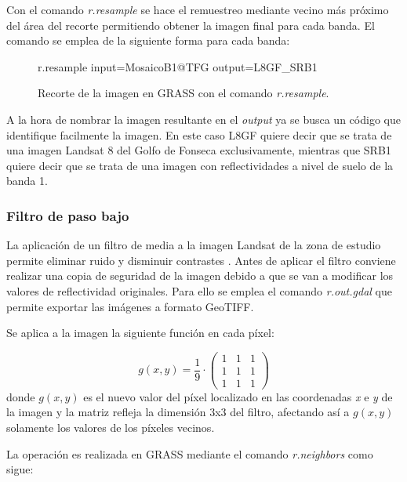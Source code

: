 Con el comando \textit{r.resample} se hace el remuestreo mediante vecino más próximo del área del recorte permitiendo obtener la imagen final para cada banda. El comando se emplea de la siguiente forma para cada banda:

\begin{figure}[h]
\centering
\begin{boxedverbatim}
	r.resample input=MosaicoB1@TFG output=L8GF_SRB1
\end{boxedverbatim}
\caption[Recorte de la imagen]{Recorte de la imagen en GRASS con el comando \textit{r.resample}.}
\end{figure}

A la hora de nombrar la imagen resultante en el \textit{output} ya se busca un código que identifique facilmente la imagen. En este caso L8GF quiere decir que se trata de una imagen Landsat 8 del Golfo de Fonseca exclusivamente, mientras que SRB1 quiere decir que se trata de una imagen con reflectividades a nivel de suelo de la banda 1.

\subsubsection{Filtro de paso bajo}
La aplicación de un filtro de media a la imagen Landsat de la zona de estudio permite eliminar ruido y disminuir contrastes \citep{aldalur2002}. Antes de aplicar el filtro conviene realizar una copia de seguridad de la imagen debido a que se van a modificar los valores de reflectividad originales. Para ello se emplea el comando \textit{r.out.gdal} que permite exportar las imágenes a formato GeoTIFF.\Sep

Se aplica a la imagen la siguiente función en cada píxel:

\begin{equation}
	g(x,y)=\frac{1}{9} \cdot \left(\begin{array}{ccc}
								   	1&1&1\\
								   	1&1&1\\
							 	   	1&1&1
								   \end{array}
							 \right)
\end{equation}
donde $g(x,y)$ es el nuevo valor del píxel localizado en las coordenadas \textit{x} e \textit{y} de la imagen y la matriz refleja la dimensión 3x3 del filtro, afectando así a $g(x,y)$ solamente los valores de los píxeles vecinos.\Sep

La operación es realizada en GRASS mediante el comando \textit{r.neighbors} como sigue:

